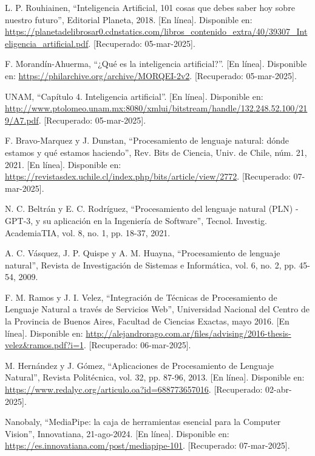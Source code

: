 \begin{thebibliography}{200}
    L. P. Rouhiainen, “Inteligencia Artificial, 101 cosas que debes saber hoy sobre nuestro futuro”, Editorial Planeta, 2018. [En línea]. Disponible en: \url{https://planetadelibrosar0.cdnstatics.com/libros_contenido_extra/40/39307_Inteligencia_artificial.pdf}. [Recuperado: 05-mar-2025].

    F. Morandín-Ahuerma, “¿Qué es la inteligencia artificial?”. [En línea]. Disponible en: \url{https://philarchive.org/archive/MORQEI-2v2}. [Recuperado: 05-mar-2025].

    UNAM, “Capítulo 4. Inteligencia artificial”. [En línea]. Disponible en: \url{http://www.ptolomeo.unam.mx:8080/xmlui/bitstream/handle/132.248.52.100/219/A7.pdf}. [Recuperado: 05-mar-2025].

    F. Bravo-Marquez y J. Dunstan, “Procesamiento de lenguaje natural: dónde estamos y qué estamos haciendo”, Rev. Bits de Ciencia, Univ. de Chile, núm. 21, 2021. [En línea]. Disponible en: \url{https://revistasdex.uchile.cl/index.php/bits/article/view/2772}. [Recuperado: 07-mar-2025].
    
    N. C. Beltrán y E. C. Rodríguez, “Procesamiento del lenguaje natural (PLN) -GPT-3, y su aplicación en la Ingeniería de Software”, Tecnol. Investig. AcademiaTIA, vol. 8, no. 1, pp. 18-37, 2021.

    A. C. Vásquez, J. P. Quispe y A. M. Huayna, “Procesamiento de lenguaje natural”, Revista de Investigación de Sistemas e Informática, vol. 6, no. 2, pp. 45-54, 2009.

    F. M. Ramos y J. I. Velez, “Integración de Técnicas de Procesamiento de Lenguaje Natural a través de Servicios Web”, Universidad Nacional del Centro de la Provincia de Buenos Aires, Facultad de Ciencias Exactas, mayo 2016. [En línea]. Disponible en: \url{http://alejandrorago.com.ar/files/advising/2016-thesis-velez&ramos.pdf?i=1}. [Recuperado: 06-mar-2025].

    M. Hernández y J. Gómez, “Aplicaciones de Procesamiento de Lenguaje Natural”, Revista Politécnica, vol. 32, pp. 87-96, 2013. [En línea]. Disponible en: \url{https://www.redalyc.org/articulo.oa?id=688773657016}. [Recuperado: 02-abr-2025].

    Nanobaly, “MediaPipe: la caja de herramientas esencial para la Computer Vision”, Innovatiana, 21-ago-2024. [En línea]. Disponible en: \url{https://es.innovatiana.com/post/mediapipe-101}. [Recuperado: 07-mar-2025].


\end{thebibliography}
